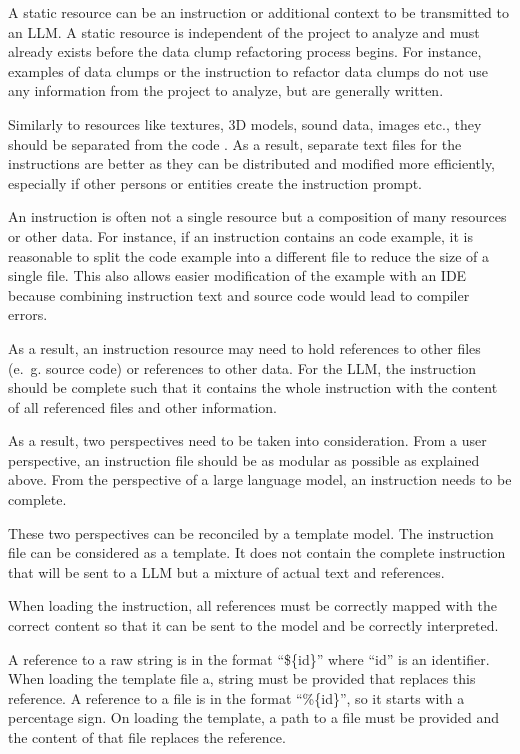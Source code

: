 A static resource can be an instruction or additional context to be transmitted to an \ac{LLM}. A static resource is independent of the project to analyze and must already exists before the data clump refactoring process begins. For instance, examples of data clumps or the instruction to refactor data clumps do not use any information from the project to analyze, but are generally written. 

 Similarly to resources like textures, 3D models, sound data, images etc., they should be separated from the code \cite{separate_code_data}. As a result, separate text files for the instructions are better as they can be distributed and modified more efficiently, especially if other persons or entities create the instruction prompt.

An instruction is often not a single resource but a composition of many resources or other data. For instance, if an instruction contains an code example, it is reasonable to split the code example into a different file to reduce the size of a single file. This  also allows easier modification of the example with an IDE because combining instruction text and source code would lead to compiler errors.

As a result, an instruction resource may need to hold references to other files (e.~g. source code) or references to other data.
For the \ac{LLM}, the instruction should be complete such that it contains the whole instruction with the content of all referenced files and other information.

As a result, two perspectives need to be taken into consideration. From a user perspective, an instruction file should be as modular as possible as explained above. From the perspective of a large language model, an instruction needs to be complete. 

These two perspectives can be reconciled by a template model. The instruction file can be considered as a template. It does not contain the complete instruction that will be sent to a \ac{LLM} but a mixture of actual text and references.

When loading the instruction, all references must be correctly mapped with the correct content so that it can be sent to the model and be correctly interpreted. 

A reference to a raw string is in the format \enquote{\$\{id\}} where \enquote{id} is an identifier. When loading the template file a, string must be provided that replaces this reference.  A reference to a file is in the format \enquote{\%\{id\}}, so it starts with a percentage sign. On loading the template, a path to a file must be  provided and the content of that file replaces the reference. 

